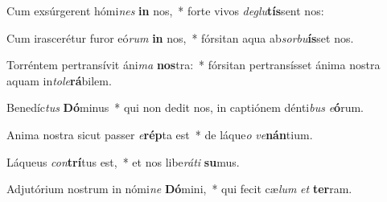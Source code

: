 \item Cum exsúrgerent hómi\textit{nes} \textbf{in} nos,~* forte vivos \textit{de}\textit{glu}\textbf{tís}sent nos:
\item Cum irascerétur furor eó\textit{rum} \textbf{in} nos,~* fórsitan aqua ab\textit{sor}\textit{bu}\textbf{ís}set nos.
\item Torréntem pertransívit áni\textit{ma} \textbf{nos}tra:~* fórsitan pertransísset ánima nostra aquam in\textit{to}\textit{le}\textbf{rá}bilem.
\item Benedíc\textit{tus} \textbf{Dó}minus~* qui non dedit nos, in captiónem dénti\textit{bus} \textit{e}\textbf{ó}rum.
\item Anima nostra sicut passer \textit{e}\textbf{rép}ta est~* de láque\textit{o} \textit{ve}\textbf{nán}tium.
\item Láqueus \textit{con}\textbf{trí}tus est,~* et nos libe\textit{rá}\textit{ti} \textbf{su}mus.
\item Adjutórium nostrum in nómi\textit{ne} \textbf{Dó}mini,~* qui fecit cæ\textit{lum} \textit{et} \textbf{ter}ram.
